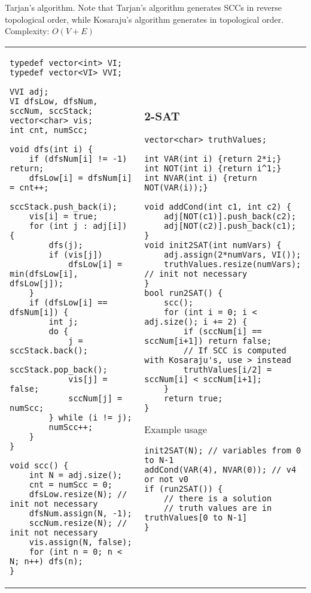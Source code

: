 \documentclass[letterpaper]{article}
\begin{document}
Tarjan's algorithm. Note that Tarjan's algorithm generates SCCs in reverse topological order, while Kosaraju's algorithm generates in topological order. Complexity: $O\left(V + E\right)$

\begin{tabular}{@{}p{9cm}p{9cm}@{}}

\begin{lstlisting}
typedef vector<int> VI;
typedef vector<VI> VVI;

VVI adj;
VI dfsLow, dfsNum, sccNum, sccStack;
vector<char> vis;
int cnt, numScc;

void dfs(int i) {
	if (dfsNum[i] != -1) return;
	dfsLow[i] = dfsNum[i] = cnt++;
	sccStack.push_back(i);
	vis[i] = true;
	for (int j : adj[i]) {
		dfs(j);
		if (vis[j])
			dfsLow[i] = min(dfsLow[i], dfsLow[j]);
	}
	if (dfsLow[i] == dfsNum[i]) {
		int j;
		do {
			j = sccStack.back();
			sccStack.pop_back();
			vis[j] = false;
			sccNum[j] = numScc;
		} while (i != j);
		numScc++;
	}
}

void scc() {
	int N = adj.size();
	cnt = numScc = 0;
	dfsLow.resize(N); // init not necessary
	dfsNum.assign(N, -1);
	sccNum.resize(N); // init not necessary
	vis.assign(N, false);
	for (int n = 0; n < N; n++) dfs(n);
}
\end{lstlisting}
&
\subsubsection{2-SAT}
\begin{lstlisting}
vector<char> truthValues;

int VAR(int i) {return 2*i;}
int NOT(int i) {return i^1;}
int NVAR(int i) {return NOT(VAR(i));}

void addCond(int c1, int c2) {
	adj[NOT(c1)].push_back(c2);
	adj[NOT(c2)].push_back(c1);
}
void init2SAT(int numVars) {
	adj.assign(2*numVars, VI());
	truthValues.resize(numVars); // init not necessary
}
bool run2SAT() {
	scc();
	for (int i = 0; i < adj.size(); i += 2) {
		if (sccNum[i] == sccNum[i+1]) return false;
		// If SCC is computed with Kosaraju's, use > instead
		truthValues[i/2] = sccNum[i] < sccNum[i+1];
	}
	return true;
}
\end{lstlisting}
Example usage
\begin{lstlisting}
init2SAT(N); // variables from 0 to N-1
addCond(VAR(4), NVAR(0)); // v4 or not v0
if (run2SAT()) {
	// there is a solution
	// truth values are in truthValues[0 to N-1]
}
\end{lstlisting}
\end{tabular}
\end{document}
